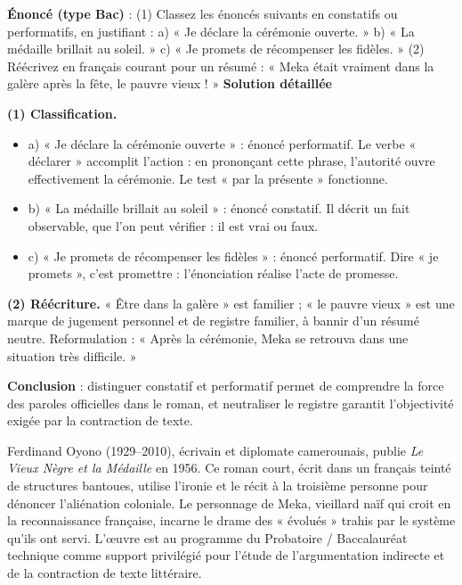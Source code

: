 \documentclass[11pt]{article}
\newcommand{\cle}[1]{{\popxbold\color{popdark}#1}}
\begin{document}
\begin{exoresolu}
\textbf{Énoncé (type Bac)} : (1) Classez les énoncés suivants en constatifs ou performatifs, en justifiant : a) « Je déclare la cérémonie ouverte. » b) « La médaille brillait au soleil. » c) « Je promets de récompenser les fidèles. » (2) Réécrivez en français courant pour un résumé : « Meka était vraiment dans la galère après la fête, le pauvre vieux ! »
\tcblower
\textbf{Solution détaillée}

\textbf{(1) Classification.}
\begin{itemize}
\item a) « Je déclare la cérémonie ouverte » : énoncé \cle{performatif}. Le verbe « déclarer » accomplit l'action : en prononçant cette phrase, l'autorité ouvre effectivement la cérémonie. Le test « par la présente » fonctionne.
\item b) « La médaille brillait au soleil » : énoncé \cle{constatif}. Il décrit un fait observable, que l'on peut vérifier : il est vrai ou faux.
\item c) « Je promets de récompenser les fidèles » : énoncé \cle{performatif}. Dire « je promets », c'est promettre : l'énonciation réalise l'acte de promesse.
\end{itemize}

\textbf{(2) Réécriture.} « Être dans la galère » est familier ; « le pauvre vieux » est une marque de jugement personnel et de registre familier, à bannir d'un résumé neutre. Reformulation : « Après la cérémonie, Meka se retrouva dans une situation très difficile. »

\textbf{Conclusion} : distinguer constatif et performatif permet de comprendre la force des paroles officielles dans le roman, et neutraliser le registre garantit l'objectivité exigée par la contraction de texte.
\end{exoresolu}

\begin{savaistu}
Ferdinand Oyono (1929--2010), écrivain et diplomate camerounais, publie \emph{Le Vieux Nègre et la Médaille} en 1956. Ce roman court, écrit dans un français teinté de structures bantoues, utilise l'ironie et le récit à la troisième personne pour dénoncer l'aliénation coloniale. Le personnage de Meka, vieillard naïf qui croit en la reconnaissance française, incarne le drame des « évolués » trahis par le système qu'ils ont servi. L'œuvre est au programme du Probatoire / Baccalauréat technique comme support privilégié pour l'étude de l'argumentation indirecte et de la contraction de texte littéraire.
\end{savaistu}
\end{document}
